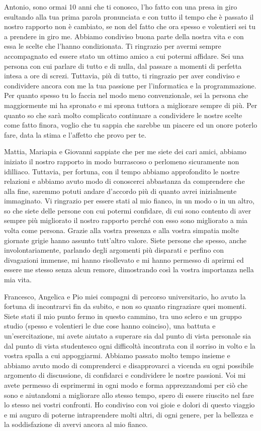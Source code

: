 Antonio, sono ormai 10 anni che ti conosco, l'ho fatto con una presa in giro esultando alla tua prima parola pronunciata e con tutto il tempo che è passato il nostro rapporto non è cambiato, se non del fatto che ora spesso e volentieri sei tu a prendere in giro me. Abbiamo condiviso buona parte della nostra vita e con essa le scelte che l'hanno condizionata. Ti ringrazio per avermi sempre accompagnato ed essere stato un ottimo amico a cui potermi affidare. Sei una persona con cui parlare di tutto e di nulla, dal passare a momenti di perfetta intesa a ore di screzi. Tuttavia, più di tutto, ti ringrazio per aver condiviso e condividere ancora con me la tua passione per l'informatica e la programmazione. Per quanto spesso tu lo faccia nel modo meno convenzionale, sei la persona che maggiormente mi ha spronato e mi sprona tuttora a migliorare sempre di più. Per quanto so che sarà molto complicato continuare a condividere le nostre scelte come fatto finora, voglio che tu sappia che sarebbe un piacere ed un onore poterlo fare, data la stima e l'affetto che provo per te.

Mattia, Mariapia e Giovanni sappiate che per me siete dei cari amici, abbiamo iniziato il nostro rapporto in modo burrascoso o perlomeno sicuramente non idilliaco. Tuttavia, per fortuna, con il tempo abbiamo approfondito le nostre relazioni e abbiamo avuto modo di conoscerci abbastanza da comprendere che alla fine, saremmo potuti andare d'accordo più di quanto avrei inizialmente immaginato. Vi ringrazio per essere stati al mio fianco, in un modo o in un altro, so che siete delle persone con cui potermi confidare, di cui sono contento di aver sempre più migliorato il nostro rapporto perché con esso sono migliorato a mia volta come persona. Grazie alla vostra presenza e alla vostra simpatia molte giornate grigie hanno assunto tutt'altro valore. Siete persone che spesso, anche involontariamente, parlando degli argomenti più disparati e perfino con divagazioni immense, mi hanno risollevato e mi hanno permesso di aprirmi ed essere me stesso senza alcun remore, dimostrando così la vostra importanza nella mia vita.

Francesco, Angelica e Pio miei compagni di percorso universitario, ho avuto la fortuna di incontrarvi fin da subito, e non so quanto ringraziare quei momenti. Siete stati il mio punto fermo in questo cammino, tra uno sclero e un gruppo studio (spesso e volentieri le due cose hanno coinciso), una battuta e un'esercitazione, mi avete aiutato a superare sia dal punto di vista personale sia dal punto di vista studentesco ogni difficoltà incontrata con il sorriso in volto e la vostra spalla a cui appoggiarmi. Abbiamo passato molto tempo insieme e abbiamo avuto modo di comprenderci e disapprovarci a vicenda su ogni possibile argomento di discussione, di confidarci e condividere le nostre passioni. Voi mi avete permesso di esprimermi in ogni modo e forma apprezzandomi per ciò che sono e aiutandomi a migliorare allo stesso tempo, spero di essere riuscito nel fare lo stesso nei vostri confronti. Ho condiviso con voi gioie e dolori di questo viaggio e mi auguro di poterne intraprendere molti altri, di ogni genere, per la bellezza e la soddisfazione di avervi ancora al mio fianco.

